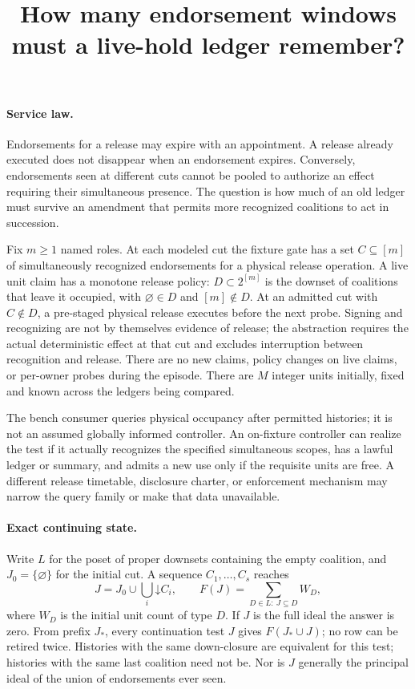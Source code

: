 \documentclass[11pt]{article}
\title{How many endorsement windows must a live-hold ledger remember?}
\date{}
\begin{document}
\maketitle

\paragraph{Service law.}
Endorsements for a release may expire with an appointment. A release already executed does not disappear when an endorsement expires. Conversely, endorsements seen at different cuts cannot be pooled to authorize an effect requiring their simultaneous presence. The question is how much of an old ledger must survive an amendment that permits more recognized coalitions to act in succession.

Fix $m\geq1$ named roles. At each modeled cut the fixture gate has a set $C\subseteq[m]$ of simultaneously recognized endorsements for a physical release operation. A live unit claim has a monotone release policy: $D\subset 2^{[m]}$ is the downset of coalitions that leave it occupied, with $\varnothing\in D$ and $[m]\notin D$. At an admitted cut with $C\notin D$, a pre-staged physical release executes before the next probe. Signing and recognizing are not by themselves evidence of release; the abstraction requires the actual deterministic effect at that cut and excludes interruption between recognition and release. There are no new claims, policy changes on live claims, or per-owner probes during the episode. There are $M$ integer units initially, fixed and known across the ledgers being compared.

The bench consumer queries physical occupancy after permitted histories; it is not an assumed globally informed controller. An on-fixture controller can realize the test if it actually recognizes the specified simultaneous scopes, has a lawful ledger or summary, and admits a new use only if the requisite units are free. A different release timetable, disclosure charter, or enforcement mechanism may narrow the query family or make that data unavailable.

\paragraph{Exact continuing state.}
Write $L$ for the poset of proper downsets containing the empty coalition, and $J_0=\{\varnothing\}$ for the initial cut. A sequence $C_1,\ldots,C_s$ reaches
\[
 J=J_0\cup\bigcup_i\mathord{\downarrow}C_i,
 \qquad F(J)=\sum_{D\in L:\ J\subseteq D}W_D,
\]
where $W_D$ is the initial unit count of type $D$. If $J$ is the full ideal the answer is zero. From prefix $J_*$, every continuation test $J$ gives $F(J_*\cup J)$; no row can be retired twice. Histories with the same down-closure are equivalent for this test; histories with the same last coalition need not be. Nor is $J$ generally the principal ideal of the union of endorsements ever seen.
\end{document}
